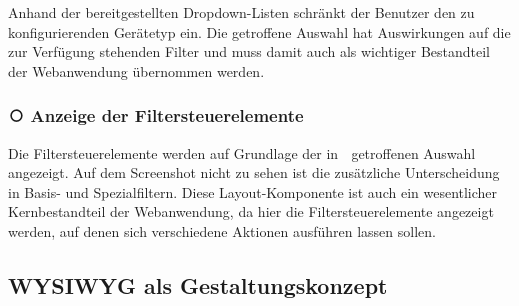 Anhand der bereitgestellten Dropdown-Listen schränkt der Benutzer den zu konfigurierenden Gerätetyp ein. Die getroffene Auswahl hat Auswirkungen auf die zur Verfügung stehenden Filter und muss damit auch als wichtiger Bestandteil der Webanwendung übernommen werden.

\subsubsection{{\larger\textcircled{}} Anzeige der Filtersteuerelemente}

Die Filtersteuerelemente werden auf Grundlage der in {\larger\textcircled{}} getroffenen Auswahl angezeigt. Auf dem Screenshot nicht zu sehen ist die zusätzliche Unterscheidung in Basis- und Spezialfiltern. Diese Layout-Komponente ist auch ein wesentlicher Kernbestandteil der Webanwendung, da hier die Filtersteuerelemente angezeigt werden, auf denen sich verschiedene Aktionen ausführen lassen sollen.

%

\subsection{WYSIWYG als Gestaltungskonzept}
\label{sec:Entwurf:WYSIWYG als Gestaltungskonzept}

